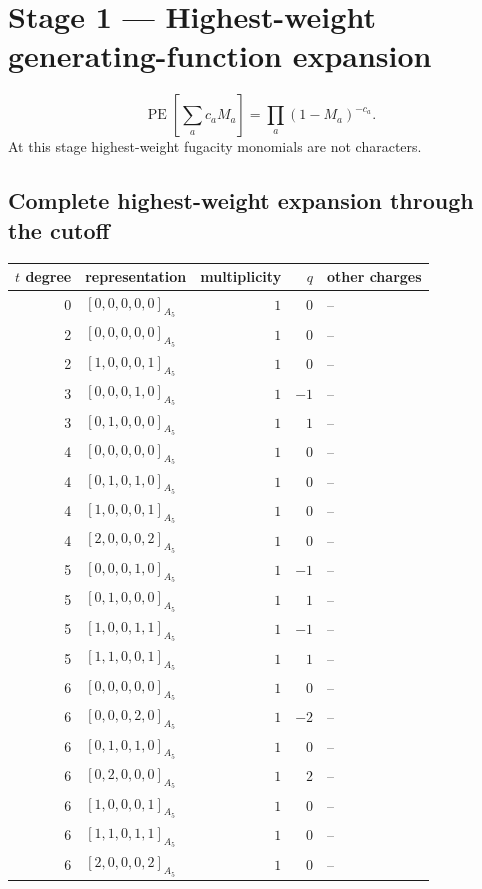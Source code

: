 \documentclass[11pt]{article}
\newcommand{\Dynkin}[1]{#1}
\begin{document}
\section{Stage 1 --- Highest-weight generating-function expansion}
\[\operatorname{PE}[\sum_a c_aM_a]=\prod_a(1-M_a)^{-c_a}.\] At this stage highest-weight fugacity monomials are not characters.
\subsection{Complete highest-weight expansion through the cutoff}
\begin{longtable}{r l r r l}
\toprule $t$ degree & representation & multiplicity & $q$ & other charges\\\midrule\endhead
0 & $\Dynkin{[0,0,0,0,0]_{A_5}}$ & $1$ & $0$ & --\\
2 & $\Dynkin{[0,0,0,0,0]_{A_5}}$ & $1$ & $0$ & --\\
2 & $\Dynkin{[1,0,0,0,1]_{A_5}}$ & $1$ & $0$ & --\\
3 & $\Dynkin{[0,0,0,1,0]_{A_5}}$ & $1$ & $-1$ & --\\
3 & $\Dynkin{[0,1,0,0,0]_{A_5}}$ & $1$ & $1$ & --\\
4 & $\Dynkin{[0,0,0,0,0]_{A_5}}$ & $1$ & $0$ & --\\
4 & $\Dynkin{[0,1,0,1,0]_{A_5}}$ & $1$ & $0$ & --\\
4 & $\Dynkin{[1,0,0,0,1]_{A_5}}$ & $1$ & $0$ & --\\
4 & $\Dynkin{[2,0,0,0,2]_{A_5}}$ & $1$ & $0$ & --\\
5 & $\Dynkin{[0,0,0,1,0]_{A_5}}$ & $1$ & $-1$ & --\\
5 & $\Dynkin{[0,1,0,0,0]_{A_5}}$ & $1$ & $1$ & --\\
5 & $\Dynkin{[1,0,0,1,1]_{A_5}}$ & $1$ & $-1$ & --\\
5 & $\Dynkin{[1,1,0,0,1]_{A_5}}$ & $1$ & $1$ & --\\
6 & $\Dynkin{[0,0,0,0,0]_{A_5}}$ & $1$ & $0$ & --\\
6 & $\Dynkin{[0,0,0,2,0]_{A_5}}$ & $1$ & $-2$ & --\\
6 & $\Dynkin{[0,1,0,1,0]_{A_5}}$ & $1$ & $0$ & --\\
6 & $\Dynkin{[0,2,0,0,0]_{A_5}}$ & $1$ & $2$ & --\\
6 & $\Dynkin{[1,0,0,0,1]_{A_5}}$ & $1$ & $0$ & --\\
6 & $\Dynkin{[1,1,0,1,1]_{A_5}}$ & $1$ & $0$ & --\\
6 & $\Dynkin{[2,0,0,0,2]_{A_5}}$ & $1$ & $0$ & --\\

\end{longtable}
\end{document}
